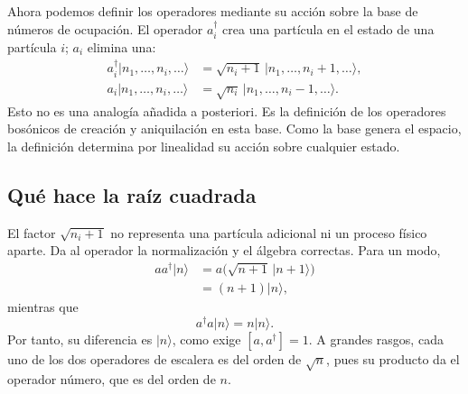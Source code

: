 Ahora podemos definir los operadores mediante su acción sobre la base de números de ocupación. El operador \(a_i^\dagger\) crea una partícula en el estado de una partícula \(i\); \(a_i\) elimina una:
\begin{align}
a_i^\dagger|n_1,\ldots,n_i,\ldots\rangle
&=\sqrt{n_i+1}\,|n_1,\ldots,n_i+1,\ldots\rangle, \\
a_i|n_1,\ldots,n_i,\ldots\rangle
&=\sqrt{n_i}\,|n_1,\ldots,n_i-1,\ldots\rangle.
\end{align}
Esto no es una analogía añadida a posteriori. Es la definición de los operadores bosónicos de creación y aniquilación en esta base. Como la base genera el espacio, la definición determina por linealidad su acción sobre cualquier estado.

\begin{classroomqa}
\end{classroomqa}

\subsection{Qué hace la raíz cuadrada}

El factor \(\sqrt{n_i+1}\) no representa una partícula adicional ni un proceso físico aparte. Da al operador la normalización y el álgebra correctas. Para un modo,
\begin{align}
a a^\dagger|n\rangle
&=a\bigl(\sqrt{n+1}\,|n+1\rangle\bigr) \\
&=(n+1)|n\rangle,
\end{align}
mientras que
\begin{equation}
a^\dagger a|n\rangle=n|n\rangle.
\end{equation}
Por tanto, su diferencia es \(|n\rangle\), como exige \([a,a^\dagger]=1\). A grandes rasgos, cada uno de los dos operadores de escalera es del orden de \(\sqrt n\), pues su producto da el operador número, que es del orden de \(n\).

\begin{classroomqa}
\end{classroomqa}

